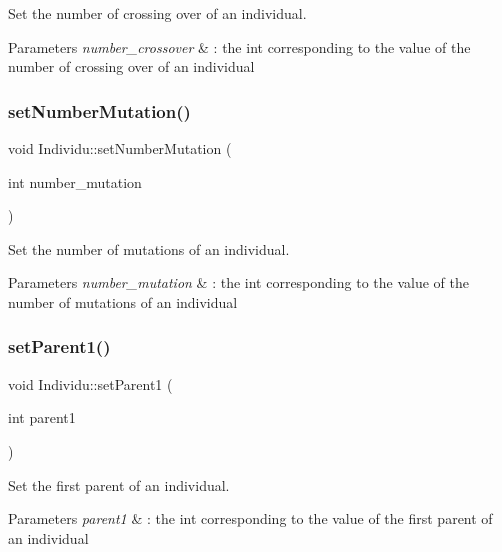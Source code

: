 Set the number of crossing over of an individual. 


\begin{DoxyParams}{Parameters}
{\em number\+\_\+crossover} & \+: the int corresponding to the value of the number of crossing over of an individual \\
\hline
\end{DoxyParams}
\mbox{\label{class_individu_a2daaf6fb00bfe902d31bd30558ec6567}} 
\subsubsection{\texorpdfstring{set\+Number\+Mutation()}{setNumberMutation()}}
{\footnotesize\ttfamily void Individu\+::set\+Number\+Mutation (\begin{DoxyParamCaption}\item[{int}]{number\+\_\+mutation }\end{DoxyParamCaption})}



Set the number of mutations of an individual. 


\begin{DoxyParams}{Parameters}
{\em number\+\_\+mutation} & \+: the int corresponding to the value of the number of mutations of an individual \\
\hline
\end{DoxyParams}
\mbox{\label{class_individu_a46912d0d2b00a414a37a6091cae891c6}} 
\subsubsection{\texorpdfstring{set\+Parent1()}{setParent1()}}
{\footnotesize\ttfamily void Individu\+::set\+Parent1 (\begin{DoxyParamCaption}\item[{int}]{parent1 }\end{DoxyParamCaption})}



Set the first parent of an individual. 


\begin{DoxyParams}{Parameters}
{\em parent1} & \+: the int corresponding to the value of the first parent of an individual \\
\hline
\end{DoxyParams}
\mbox{\label{class_individu_a134f7718457e3881bf3d60bfd5b05c08}} 
